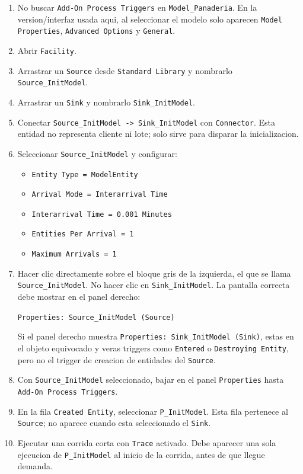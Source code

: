 \documentclass[11pt]{article}
\newcommand{\simio}[1]{\texttt{#1}}
\newcommand{\proc}[1]{\texttt{#1}}
\begin{document}
\begin{enumerate}
  \item No buscar \simio{Add-On Process Triggers} en \simio{Model\_Panaderia}. En la version/interfaz usada aqui, al seleccionar el modelo solo aparecen \simio{Model Properties}, \simio{Advanced Options} y \simio{General}.
  \item Abrir \simio{Facility}.
  \item Arrastrar un \simio{Source} desde \simio{Standard Library} y nombrarlo \simio{Source\_InitModel}.
  \item Arrastrar un \simio{Sink} y nombrarlo \simio{Sink\_InitModel}.
  \item Conectar \simio{Source\_InitModel -> Sink\_InitModel} con \simio{Connector}. Esta entidad no representa cliente ni lote; solo sirve para disparar la inicializacion.
  \item Seleccionar \simio{Source\_InitModel} y configurar:
  \begin{itemize}
    \item \simio{Entity Type = ModelEntity}
    \item \simio{Arrival Mode = Interarrival Time}
    \item \simio{Interarrival Time = 0.001 Minutes}
    \item \simio{Entities Per Arrival = 1}
    \item \simio{Maximum Arrivals = 1}
  \end{itemize}
  \item Hacer clic directamente sobre el bloque gris de la izquierda, el que se llama \simio{Source\_InitModel}. No hacer clic en \simio{Sink\_InitModel}. La pantalla correcta debe mostrar en el panel derecho:
  \begin{center}
  \simio{Properties: Source\_InitModel (Source)}
  \end{center}
  Si el panel derecho muestra \simio{Properties: Sink\_InitModel (Sink)}, estas en el objeto equivocado y veras triggers como \simio{Entered} o \simio{Destroying Entity}, pero no el trigger de creacion de entidades del \simio{Source}.
  \item Con \simio{Source\_InitModel} seleccionado, bajar en el panel \simio{Properties} hasta \simio{Add-On Process Triggers}.
  \item En la fila \simio{Created Entity}, seleccionar \proc{P\_InitModel}. Esta fila pertenece al \simio{Source}; no aparece cuando esta seleccionado el \simio{Sink}.
  \item Ejecutar una corrida corta con \simio{Trace} activado. Debe aparecer una sola ejecucion de \proc{P\_InitModel} al inicio de la corrida, antes de que llegue demanda.
\end{enumerate}
\end{document}
